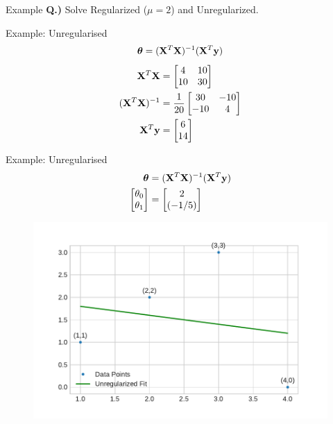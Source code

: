 \documentclass{beamer}
\begin{document}
\begin{frame}{Example}
\vspace{0.4cm}
\textbf{Q.)} Solve Regularized ($\mu = 2$) and Unregularized.
\vspace{-0.6cm}
\begin{figure}
\end{figure}
\end{frame}

\begin{frame}{Example: Unregularised}
\[
\boldsymbol{\theta} = (\mathbf{X}^{T}\mathbf{X})^{-1}(\mathbf{X}^{T}\mathbf{y})
\]
\pause
\begin{align*}
\mathbf{X}^{T}\mathbf{X} &= \begin{bmatrix}
4 &10\\10&30
\end{bmatrix} \\
(\mathbf{X}^{T}\mathbf{X})^{-1} &= \frac{1}{20} \begin{bmatrix}
30 & -10\\
-10& 4
\end{bmatrix}\\
\mathbf{X}^{T}\mathbf{y} &= \begin{bmatrix}
6\\
14
\end{bmatrix}
\end{align*}
\end{frame}


\begin{frame}{Example: Unregularised}
\vspace{0.4cm}
\begin{align*}
\begin{split}
\boldsymbol{\theta} &= (\mathbf{X}^{T}\mathbf{X})^{-1}(\mathbf{X}^{T}\mathbf{y})\\
\begin{bmatrix}
\theta_{0}\\
\theta_{1}
\end{bmatrix} &= 
\begin{bmatrix}
2\\
(-1/5)
\end{bmatrix} 
\end{split}
\end{align*}
\vspace{-0.8cm}
\begin{figure}
\includegraphics[width=0.8\linewidth]{../assets/ridge-regression/figures/q_unreg.pdf}
\end{figure}
\end{frame}
\end{document}
